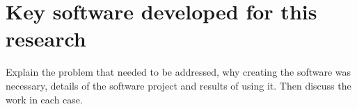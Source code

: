 \chapter{Key software developed for this research}

Explain the problem that needed to be addressed, why creating the software was necessary, details of the software project and results of using it. Then discuss the work in each case.

